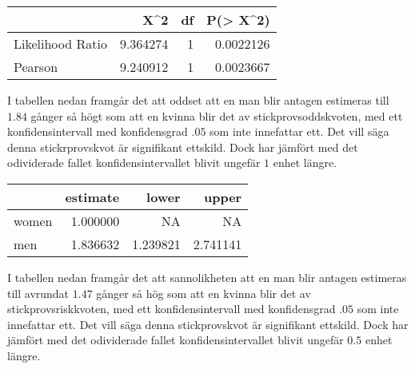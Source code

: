 \documentclass[]{article}
\newenvironment{Shaded}{\begin{snugshade}}{\end{snugshade}}
\newcommand{\KeywordTok}[1]{\textcolor[rgb]{0.13,0.29,0.53}{\textbf{#1}}}
\newcommand{\NormalTok}[1]{#1}
\newcommand{\OperatorTok}[1]{\textcolor[rgb]{0.81,0.36,0.00}{\textbf{#1}}}
\newcommand{\StringTok}[1]{\textcolor[rgb]{0.31,0.60,0.02}{#1}}
\begin{document}
\begin{Shaded}
\end{Shaded}

\begin{longtable}[]{@{}lrrr@{}}
\toprule
& X\^{}2 & df & P(\textgreater{} X\^{}2)\tabularnewline
\midrule
\endhead
Likelihood Ratio & 9.364274 & 1 & 0.0022126\tabularnewline
Pearson & 9.240912 & 1 & 0.0023667\tabularnewline
\bottomrule
\end{longtable}

I tabellen nedan framgår det att oddset att en man blir antagen
estimeras till \(1.84\) gånger så högt som att en kvinna blir det av
stickprovsoddskvoten, med ett konfidensintervall med konfidensgrad
\(.05\) som inte innefattar ett. Det vill säga denna stickrprovskvot är
signifikant ettskild. Dock har jämfört med det odividerade fallet
konfidensintervallet blivit ungefär \(1\) enhet längre.

\begin{Shaded}
\end{Shaded}

\begin{longtable}[]{@{}lrrr@{}}
\toprule
& estimate & lower & upper\tabularnewline
\midrule
\endhead
women & 1.000000 & NA & NA\tabularnewline
men & 1.836632 & 1.239821 & 2.741141\tabularnewline
\bottomrule
\end{longtable}

I tabellen nedan framgår det att sannolikheten att en man blir antagen
estimeras till avrundat \(1.47\) gånger så hög som att en kvinna blir
det av stickprovsriskkvoten, med ett konfidensintervall med
konfidensgrad \(.05\) som inte innefattar ett. Det vill säga denna
stickprovskvot är signifikant ettskild. Dock har jämfört med det
odividerade fallet konfidensintervallet blivit ungefär \(0.5\) enhet
längre.

\begin{Shaded}
\end{Shaded}
\end{document}
